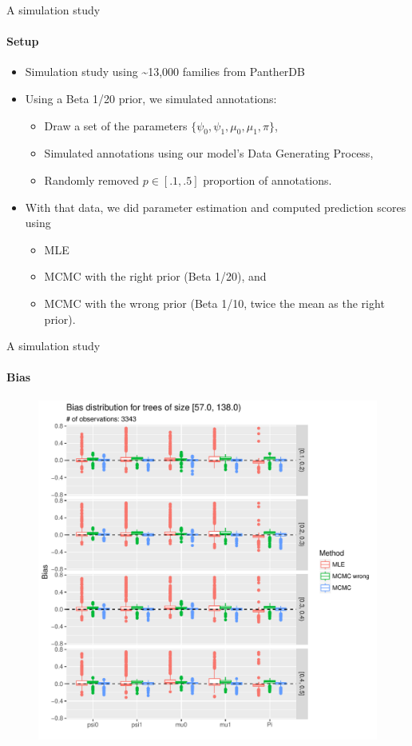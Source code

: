 \documentclass[9pt,handout,ignorenonframetext,]{beamer}
\providecommand{\tightlist}{%
  \setlength{\itemsep}{0pt}\setlength{\parskip}{0pt}}
\begin{document}
\begin{frame}[t,label=sim-setup]{A simulation study}

\framesubtitle{Setup}

\begin{itemize}
\item
  Simulation study using \textasciitilde{}13,000 families from PantherDB
\item
  Using a Beta 1/20 prior, we simulated annotations:

  \begin{itemize}
  \item
    Draw a set of the parameters
    \(\{\psi_0,\psi_1 ,\mu_0, \mu_1,\pi\}\),
  \item
    Simulated annotations using our model's Data Generating Process,
  \item
    Randomly removed \(p\in [.1, .5]\) proportion of annotations.
  \end{itemize}
\item
  With that data, we did parameter estimation and computed prediction
  scores using

  \begin{itemize}
  \tightlist
  \item
    MLE
  \item
    MCMC with the right prior (Beta 1/20), and
  \item
    MCMC with the wrong prior (Beta 1/10, twice the mean as the right
    prior).
  \end{itemize}
\end{itemize}

\hyperlink{sim-convergence}{}

\end{frame}

\begin{frame}[t]{A simulation study}

\framesubtitle{Bias}

\begin{figure}
\centering
\includegraphics[width=.68\linewidth]{bias_trees_of_size_[57,138).pdf}
\end{figure}

\end{frame}
\end{document}
